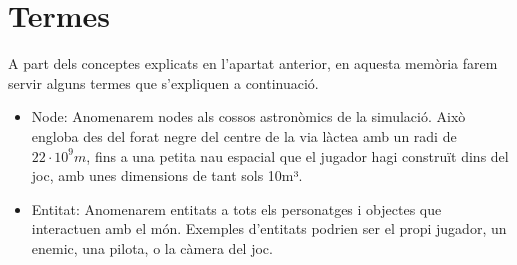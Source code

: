 \section{Termes}
A part dels conceptes explicats en l'apartat anterior, en aquesta memòria farem servir alguns termes que s'expliquen a continuació.
\begin{itemize}
  \item{Node: }Anomenarem nodes als cossos astronòmics de la simulació. Això engloba des del forat negre del centre de la via làctea amb un radi de $22\cdot10^{9}m$, fins a una petita nau espacial que el jugador hagi construït dins del joc, amb unes dimensions de tant sols 10m³.
  \item{Entitat: }Anomenarem entitats a tots els personatges i objectes que interactuen amb el món. Exemples d'entitats podrien ser el propi jugador, un enemic, una pilota, o la càmera del joc.
\end{itemize}
